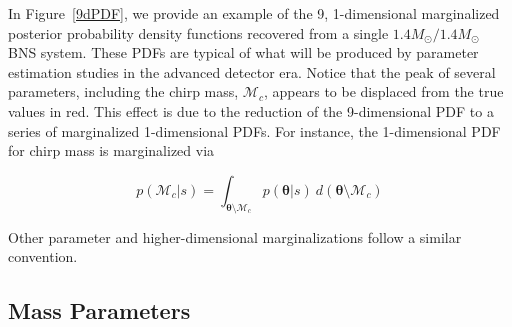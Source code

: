 \documentclass[11pt,a4paper]{emulateapj}
\begin{document}
In Figure~\ref{9dPDF}, we provide an example of the 9, 1-dimensional marginalized posterior 
probability density functions recovered from a single $1.4M_{\odot}/1.4M_{\odot}$ BNS system. 
 These PDFs are typical of what will be produced by parameter estimation studies in the advanced 
 detector era.  Notice that the peak of several parameters, including the chirp mass, $\mathcal{M}_c$, 
 appears to be displaced from the true values in red.  This effect is due to the reduction of the
  9-dimensional PDF to a series of marginalized 1-dimensional PDFs.  For instance, the 1-dimensional 
  PDF for chirp mass is marginalized via

\begin{equation}
p(\mathcal{M}_c | s) = \int _{\boldsymbol{\theta} \setminus \mathcal{M}_c} p(\boldsymbol{\theta} | s)~d(\boldsymbol{\theta} \setminus \mathcal{M}_c)
\label{mcMarginalization}
\end{equation}

\noindent Other parameter and higher-dimensional marginalizations follow a similar convention.



\subsection{Mass Parameters}
\label{massSection}
\end{document}
